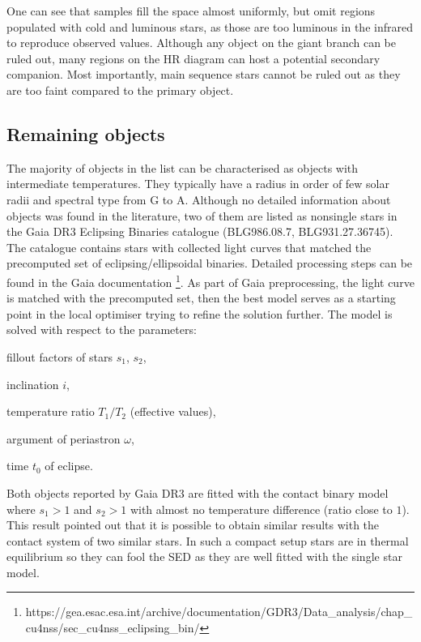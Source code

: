 \documentclass{pracalicmgr}
\newenvironment{itemize*}%
  {\vspace{-\topsep}
    \begin{itemize}%
    \setlength{\itemsep}{0pt}%
    \setlength{\parskip}{0pt}}%
  {\end{itemize}
  \vspace{-\topsep}}
\begin{document}
One can see that samples fill the space almost uniformly, but omit regions populated with cold and luminous stars, as those are too luminous in the infrared to reproduce observed values.
Although any object on the giant branch can be ruled out, many regions on the HR diagram can host a potential secondary companion. 
Most importantly, main sequence stars cannot be ruled out as they are too faint compared to the primary object.
\newpage
\subsection{Remaining objects}
The majority of objects in the list can be characterised as objects with intermediate temperatures. They typically have a radius in order of
few solar radii and spectral type from G to A.
Although no detailed information about objects was found in the literature, two of them
are listed as nonsingle stars in the Gaia DR3 Eclipsing Binaries catalogue (BLG986.08.7, BLG931.27.36745).
The catalogue contains stars with collected light curves that matched the precomputed set of eclipsing/ellipsoidal binaries. 
Detailed processing steps can be found in the Gaia documentation \footnote[1]{https://gea.esac.esa.int/archive/documentation/GDR3/Data\_analysis/chap\_cu4nss/sec\_cu4nss\_eclipsing\_bin/}.
As part of Gaia preprocessing, the light curve is matched with the precomputed set, then the best model serves as a starting point in the local optimiser trying to refine the solution further.
The model is solved with respect to the parameters:
\begin{itemize*}
    \item fillout factors of stars $s_1$, $s_2$,
    \item inclination $i$,
    \item temperature ratio $T_1/T_2$ (effective values),
    \item argument of periastron $\omega$,
    \item time $t_0$ of eclipse.
\end{itemize*}
Both objects reported by Gaia DR3 are fitted with the contact binary model where $s_1>1$ and $s_2>1$ with almost no
temperature difference (ratio close to $1$). This result pointed out that it is possible to obtain similar results
with the contact system of two similar stars. In such a compact setup stars are in thermal equilibrium so they can fool the SED as
they are well fitted with the single star model. 
\end{document}
